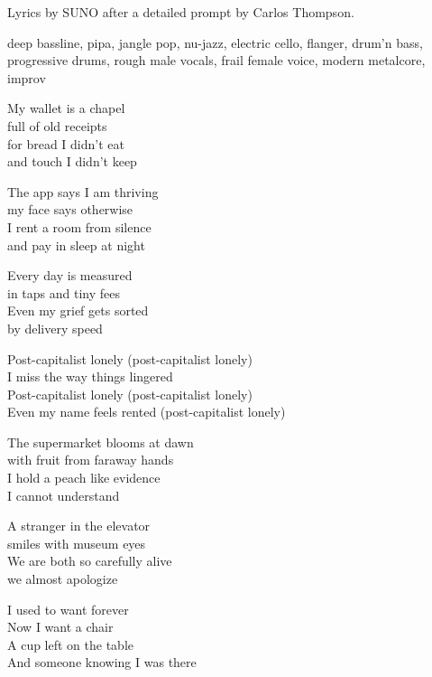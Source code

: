 
\begin{notes}
Lyrics by SUNO after a detailed prompt by Carlos Thompson.
\end{notes}
\begin{style}
deep bassline, pipa, jangle pop, nu-jazz, electric cello, flanger, drum'n bass, progressive drums, rough male vocals, frail female voice, modern metalcore, improv
\end{style}
\begin{lyrics}
My wallet is a chapel\\
full of old receipts\\
for bread I didn't eat\\
and touch I didn't keep

The app says I am thriving\\
my face says otherwise\\
I rent a room from silence\\
and pay in sleep at night

Every day is measured\\
in taps and tiny fees\\
Even my grief gets sorted\\
by delivery speed

Post-capitalist lonely (post-capitalist lonely)\\
I miss the way things lingered\\
Post-capitalist lonely (post-capitalist lonely)\\
Even my name feels rented
(post-capitalist lonely)

The supermarket blooms at dawn\\
with fruit from faraway hands\\
I hold a peach like evidence\\
I cannot understand

A stranger in the elevator\\
smiles with museum eyes\\
We are both so carefully alive\\
we almost apologize

I used to want forever\\
Now I want a chair\\
A cup left on the table\\
And someone knowing I was there


\end{lyrics}
